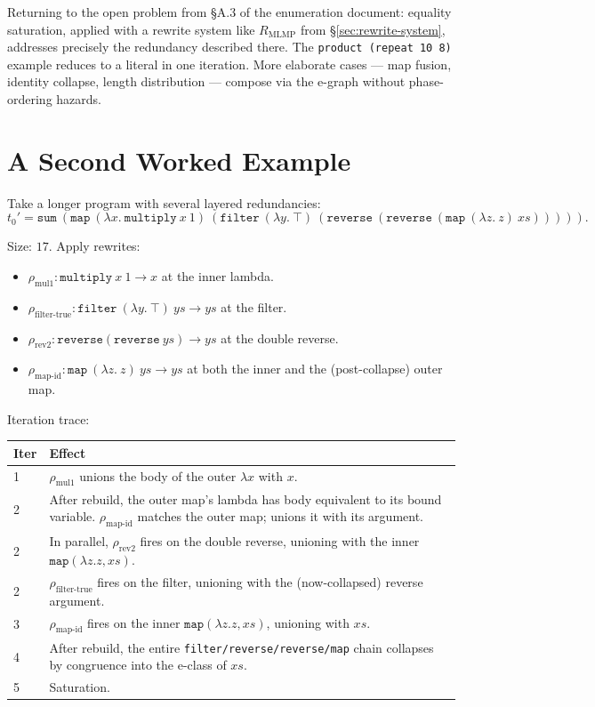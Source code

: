 \documentclass[11pt,a4paper]{article}
\begin{document}
Returning to the open problem from §A.3 of the enumeration document: equality saturation, applied with a rewrite system like $R_{\text{MLMP}}$ from §\ref{sec:rewrite-system}, addresses precisely the redundancy described there. The \texttt{product (repeat 10 8)} example reduces to a literal in one iteration. More elaborate cases --- map fusion, identity collapse, length distribution --- compose via the e-graph without phase-ordering hazards.

\appendix

\section{A Second Worked Example}\label{sec:appendix-example}

Take a longer program with several layered redundancies:
\[
  t_0' = \mathtt{sum}\ (\mathtt{map}\ (\lambda x.\ \mathtt{multiply}\ x\ 1)\ (\mathtt{filter}\ (\lambda y.\ \top)\ (\mathtt{reverse}\ (\mathtt{reverse}\ (\mathtt{map}\ (\lambda z.\ z)\ xs))))).
\]

Size: $17$. Apply rewrites:
\begin{itemize}
\item $\rho_{\text{mul1}}: \mathtt{multiply}\ x\ 1 \to x$ at the inner lambda.
\item $\rho_{\text{filter-true}}: \mathtt{filter}\ (\lambda y.\ \top)\ ys \to ys$ at the filter.
\item $\rho_{\text{rev2}}: \mathtt{reverse}(\mathtt{reverse}\ ys) \to ys$ at the double reverse.
\item $\rho_{\text{map-id}}: \mathtt{map}\ (\lambda z.\ z)\ ys \to ys$ at both the inner and the (post-collapse) outer map.
\end{itemize}

Iteration trace:

\begin{center}
\begin{tabular}{ll}
\toprule
Iter & Effect \\
\midrule
1 & $\rho_{\text{mul1}}$ unions the body of the outer $\lambda x$ with $x$. \\
2 & After rebuild, the outer map's lambda has body equivalent to its bound variable. $\rho_{\text{map-id}}$ matches the outer map; unions it with its argument. \\
2 & In parallel, $\rho_{\text{rev2}}$ fires on the double reverse, unioning with the inner $\mathtt{map}(\lambda z. z, xs)$. \\
2 & $\rho_{\text{filter-true}}$ fires on the filter, unioning with the (now-collapsed) reverse argument. \\
3 & $\rho_{\text{map-id}}$ fires on the inner $\mathtt{map}(\lambda z. z, xs)$, unioning with $xs$. \\
4 & After rebuild, the entire \texttt{filter/reverse/reverse/map} chain collapses by congruence into the e-class of $xs$. \\
5 & Saturation. \\
\bottomrule
\end{tabular}
\end{center}
\end{document}
